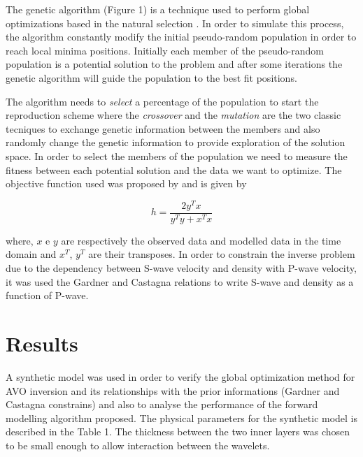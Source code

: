 \documentclass{vie16}
\begin{document}
The genetic algorithm (Figure 1) is a technique used to perform global 
optimizations based in the natural selection \cite{Holland1975}. In order to 
simulate this process, the algorithm constantly modify the initial 
pseudo-random population in order to reach local minima positions. 
Initially each member of the pseudo-random population is a potential 
solution to the problem and after some iterations the genetic algorithm will 
guide the population to the best fit positions.

The algorithm needs to \textit{select} a percentage of the population to start 
the reproduction scheme where the \textit{crossover} and the 
\textit{mutation} are the two classic tecniques to exchange genetic 
information between the members and also randomly change the genetic 
information to provide exploration of the solution space. In order to select 
the members of the population we need to measure the fitness between each 
potential solution and the data we want to optimize. The objective function 
used was proposed by \cite{Porsani2000} and is given by

\begin{equation}
h = \frac{2y^{T} x} {y^{T}y + x^{T}x} \label{eq.Porsani}
\end{equation} 

where, $x$ e $y$ are respectively the observed data and modelled data in 
the time domain and  $x^{T}$, $y^{T}$ are their transposes. In order to 
constrain the inverse problem due to the dependency between S-wave 
velocity and density with P-wave velocity, it was used the Gardner 
\citep{Gardner01121974} and Castagna \citep{Castagna01041985} relations 
to write S-wave and density as a function of P-wave.

\section{Results}
A synthetic model was used in order to verify the global optimization 
method for AVO inversion and its relationships with the prior informations 
(Gardner and Castagna constrains) and also to analyse the performance of 
the forward modelling algorithm proposed. The physical parameters for the 
synthetic model is described in the Table 1. The thickness between the two 
inner layers was chosen to be small enough to allow interaction between the 
wavelets.
\end{document}

